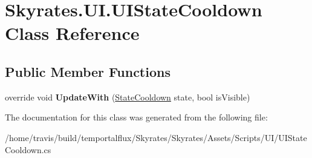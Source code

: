 \hypertarget{class_skyrates_1_1_u_i_1_1_u_i_state_cooldown}{\section{Skyrates.\-U\-I.\-U\-I\-State\-Cooldown Class Reference}
\label{class_skyrates_1_1_u_i_1_1_u_i_state_cooldown}
}
\subsection*{Public Member Functions}
\begin{DoxyCompactItemize}
\item 
\hypertarget{class_skyrates_1_1_u_i_1_1_u_i_state_cooldown_a9f162afbdc6f951862b8752b2208e6c9}{override void {\bfseries Update\-With} (\hyperlink{class_skyrates_1_1_misc_1_1_state_cooldown}{State\-Cooldown} state, bool is\-Visible)}\label{class_skyrates_1_1_u_i_1_1_u_i_state_cooldown_a9f162afbdc6f951862b8752b2208e6c9}

\end{DoxyCompactItemize}


The documentation for this class was generated from the following file\-:\begin{DoxyCompactItemize}
\item 
/home/travis/build/temportalflux/\-Skyrates/\-Skyrates/\-Assets/\-Scripts/\-U\-I/U\-I\-State\-Cooldown.\-cs\end{DoxyCompactItemize}
